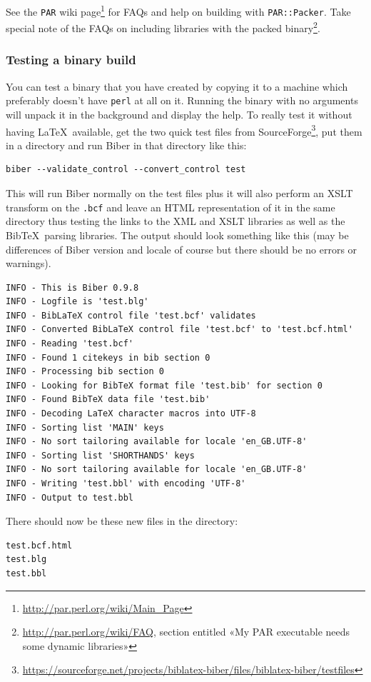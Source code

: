 \documentclass{ltxdockit}
\begin{document}
See the \verb+PAR+ wiki
page\footnote{\url{http://par.perl.org/wiki/Main_Page}} for FAQs and help
on building with \verb+PAR::Packer+. Take special note of the FAQs on
including libraries with the packed
binary\footnote{\url{http://par.perl.org/wiki/FAQ}, section entitled «My
  PAR executable needs some dynamic libraries»}.

\subsubsection{Testing a binary build}
You can test a binary that you have created by copying it to a machine
which preferably doesn't have \verb+perl+ at all on it. Running the binary with no
arguments will unpack it in the background and display the help. To really
test it without having \LaTeX\ available, get the two quick test files from
SourceForge\footnote{\url{https://sourceforge.net/projects/biblatex-biber/files/biblatex-biber/testfiles}},
put them in a directory and run Biber in that directory like this:

\begin{verbatim}
biber --validate_control --convert_control test
\end{verbatim}

\noindent This will run Biber normally on the test files plus it
will also perform an XSLT transform on the \verb+.bcf+ and
leave an HTML representation of it in the same directory thus testing the
links to the XML and XSLT libraries as well as the Bib\TeX\ parsing
libraries. The output should look something like this (may be differences
of Biber version and locale of course but there should be no errors
or warnings).

\begin{verbatim}
INFO - This is Biber 0.9.8
INFO - Logfile is 'test.blg'
INFO - BibLaTeX control file 'test.bcf' validates
INFO - Converted BibLaTeX control file 'test.bcf' to 'test.bcf.html'
INFO - Reading 'test.bcf'
INFO - Found 1 citekeys in bib section 0
INFO - Processing bib section 0
INFO - Looking for BibTeX format file 'test.bib' for section 0
INFO - Found BibTeX data file 'test.bib'
INFO - Decoding LaTeX character macros into UTF-8
INFO - Sorting list 'MAIN' keys
INFO - No sort tailoring available for locale 'en_GB.UTF-8'
INFO - Sorting list 'SHORTHANDS' keys
INFO - No sort tailoring available for locale 'en_GB.UTF-8'
INFO - Writing 'test.bbl' with encoding 'UTF-8'
INFO - Output to test.bbl
\end{verbatim}

\noindent There should now be these new files in the directory:

\begin{verbatim}
test.bcf.html
test.blg
test.bbl
\end{verbatim}
\end{document}
